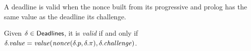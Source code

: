 %
A deadline is valid when the nonce built from its progressive and prolog
has the same value as the deadline \wrt its challenge.
%
\begin{definition}\label{def:deadline_validity}
  Given $\delta\in{\mathsf{Deadlines}}$, it is \emph{valid} if and only if
  $\delta.\mathit{value}=\mathit{value}({\mathit{nonce}}(\delta.p,\delta.\pi),\delta.{\mathit{challenge}})$.
\end{definition}
%
